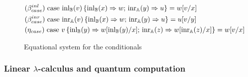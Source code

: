 \documentclass[10pt,a4paper]{amsart}
\theoremstyle{definition}
\theoremstyle{definition}
\theoremstyle{definition}
\theoremstyle{definition}
\theoremstyle{definition}
\theoremstyle{definition}
\begin{document}
  \begin{figure}[h!]
    \centering
    \begin{tcolorbox}[colframe=black, colback=white, boxrule=0.6pt, arc=1pt,boxsep=1pt,top=1pt,bottom=1pt, width=0.85 \textwidth]
    \begin{equation*}
        \begin{split}
          &(\beta_{case}^{inl}) \hspace{3pt} \text{case } 
          \mathrm{inl}_{\mathbb{B}}(v)\, \{ \mathrm{inl}_{\mathbb{B}} (x) \Rightarrow w 
          ;\, \mathrm{inr}_{\mathbb{A}} (y) 
          \Rightarrow u\}= w[v/x]
          \\
          &(\beta_{case}^{inr}) \hspace{3pt} \text{case } 
          \mathrm{inr}_{\mathbb{A}}(v)\, \{ \mathrm{inl}_{\mathbb{B}} (x) \Rightarrow w 
          ;\, \mathrm{inr}_{\mathbb{A}} (y) 
          \Rightarrow u\}= u[v/y]
          \\
          & (\eta_{case}) \hspace{3pt} \text{case } v\, \{\text{inl}_{\mathbb{B}} (y) \Rightarrow w [ \text{inl}_{\mathbb{B}}(y)/x] ;\, \text{inr}_{\mathbb{A}} (z) \Rightarrow w [ \text{inr}_{\mathbb{A}}(z)/x]\} = w[v/x] 
        \end{split}
    \end{equation*}
    \end{tcolorbox}
    \caption{Equational system for the conditionals}
    \label{fig:equations-in-context-cond}
    \end{figure}


\subsubsection{Linear $\lambda$-calculus and quantum computation} \label{subsec:syntax_qc}
\end{document}
